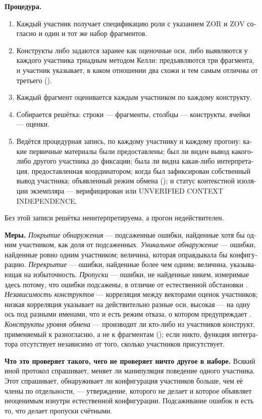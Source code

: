 \begin{russian}
\textbf{Процедура.}

\begin{enumerate}
  \item Каждый участник получает спецификацию роли с указанием ZOR и ZOV согласно  и один и тот же набор фрагментов.
  \item Конструкты либо задаются заранее как оценочные оси, либо выявляются у каждого участника триадным методом Келли: предъявляются три фрагмента, и участник указывает, в каком отношении два схожи и тем самым отличны от третьего ().
  \item Каждый фрагмент оценивается каждым участником по каждому конструкту.
  \item Собирается решётка: строки — фрагменты, столбцы — конструкты, ячейки — оценки.
  \item Ведётся процедурная запись, по каждому участнику и каждому прогону: какие первичные материалы были предоставлены; был ли виден вывод какого-либо другого участника до фиксации; была ли видна какая-либо интерпретация, предоставленная координатором; когда был зафиксирован собственный вывод участника; объявленный режим обмена (); и статус контекстной изоляции экземпляра — верифицирован или UNVERIFIED CONTEXT INDEPENDENCE.
\end{enumerate}
Без этой записи решётка неинтерпретируема, а прогон недействителен.

\textbf{Меры.} \emph{Покрытие обнаружения} — подсаженные ошибки, найденные хотя бы одним участником, как доля от подсаженных. \emph{Уникальное обнаружение} — ошибки, найденные ровно одним участником; величина, которая оправдывала бы конфигурацию. \emph{Перекрытие} — ошибки, найденные более чем одним; величина, указывающая на избыточность. \emph{Пропуски} — ошибки, не найденные никем, измеримые здесь потому, что ошибки подсажены, в отличие от естественной обстановки . \emph{Независимость конструктов} — корреляция между векторами оценок участников; низкая корреляция указывает на действительно разные оси, высокая — на одну ось под разными именами, что и есть режим отказа, о котором предупреждает . \emph{Конструкты уровня обмена} — производит ли кто-либо из участников конструкт, применяемый к разногласию, а не к фрагментам (); если никто, функция интегратора отсутствует независимо от того, сколько участников присутствует.

\textbf{Что это проверяет такого, чего не проверяет ничто другое в наборе.} Всякий иной протокол спрашивает, меняет ли манипуляция поведение одного участника. Этот спрашивает, обнаруживает ли конфигурация участников больше, чем её члены по отдельности, — утверждение, которого  не делает и которое  объявляет неоценимым изнутри естественной конфигурации. Подсаживание ошибок и есть то, что делает пропуски счётными.


\end{russian}
